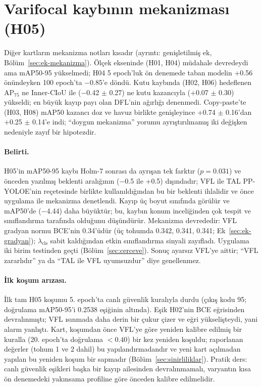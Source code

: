 \documentclass[pdflatex,iicol,sn-mathphys-num]{sn-jnl}
\begin{document}
\section{Varifocal kaybının mekanizması (H05)}\label{sec:basarisiz}\label{sec:h05}

Diğer kartların mekanizma notları kısadır (ayrıntı: genişletilmiş ek, Bölüm~\ref{sec:ek-mekanizma}). Ölçek ekseninde (H01, H04) müdahale devredeydi ama mAP50-95 yükselmedi; H04 5 epoch'luk ön denemede taban modelin +0.56 önündeyken 100 epoch'ta $-$0.85'e döndü. Kutu kaybında (H02, H06) hedeflenen AP$_{75}$ ne Inner-CIoU ile ($-$0.42 $\pm$ 0.27) ne kutu kazancıyla (+0.07 $\pm$ 0.30) yükseldi; en büyük kayıp payı olan DFL'nin ağırlığı denenmedi. Copy-paste'te (H03, H08) mAP50 kazancı doz ve havuz birlikte genişleyince +0.74 $\pm$ 0.16'dan +0.25 $\pm$ 0.14'e indi; ``doygun mekanizma'' yorumu ayrıştırılmamış iki değişken nedeniyle zayıf bir hipotezdir.

\paragraph{Belirti.}
H05'in mAP50-95 kaybı Holm-7 sonrası da ayrışan tek farktır ($p=0.031$) ve önceden yazılmış beklenti aralığının ($-$0.5 ile +0.5) dışındadır; VFL ile TAL PP-YOLOE'nin reçetesinde birlikte kullanıldığından \cite{xu_2022_ppyoloe} bu bir beklenti ihlalidir ve önce uygulama ile mekanizma denetlendi. Kayıp üç boyut sınıfında görülür ve mAP50'de ($-$4.44) daha büyüktür; bu, kaybın konum inceliğinden çok tespit ve sınıflandırma tarafında olduğunu düşündürür. Mekanizma devrededir: VFL gradyan normu BCE'nin 0.34'üdür (üç tohumda 0.342, 0.341, 0.341; Ek~\ref{sec:ek-gradyan}); $\lambda_{\mathrm{cls}}$ sabit kaldığından etkin sınıflandırma sinyali zayıfladı. Uygulama iki birim testinden geçti (Bölüm~\ref{sec:cerceve}). Sonuç ayarsız VFL'ye aittir; ``VFL zararlıdır'' ya da ``TAL ile VFL uyumsuzdur'' diye genellenmez.

\paragraph{İlk koşum arızası.}
İlk tam H05 koşumu 5. epoch'ta canlı güvenlik kuralıyla durdu (çıkış kodu 95; doğrulama mAP50-95'i 0.2538 eşiğinin altında). Eşik H02'nin BCE eğrisinden devralınmıştı; VFL ısınmada daha derin bir çukur çizer ve eğri yükselişteydi, yani alarm yanlıştı. Kart, koşumdan önce VFL'ye göre yeniden kalibre edilmiş bir kuralla (20. epoch'ta doğrulama $<0.40$) bir kez yeniden koşuldu; raporlanan değerler (tohum 1 ve 2 dahil) bu yapılandırmadandır ve yeni kart açılmadan yapılan bu yeniden koşum bir sapmadır (Bölüm~\ref{sec:sinirliliklar}). Pratik ders: canlı güvenlik eşikleri başka bir kayıp ailesinden devralınmamalı, varyantın kısa ön denemedeki yakınsama profiline göre önceden kalibre edilmelidir.
\end{document}
